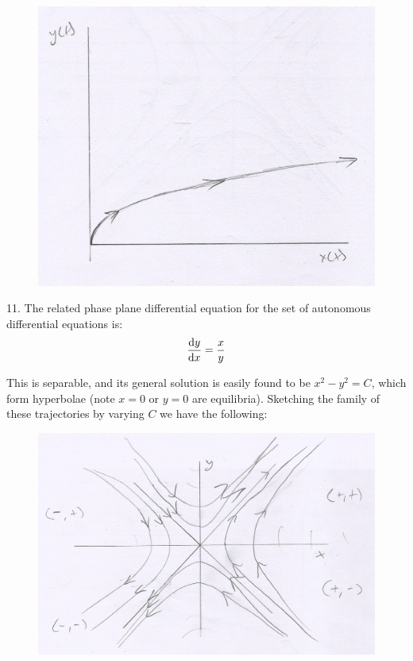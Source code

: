 \documentclass[11pt]{article}
\begin{document}
\begin{figure}[h]
    \centering
    \includegraphics[scale=0.75]{sketch1}
\end{figure}

11. The related phase plane differential equation for the set of autonomous differential equations is:
$$\dv{y}{x} = \frac{x}{y}$$

This is separable, and its general solution is easily found to be $x^2 - y^2 = C$, which form hyperbolae (note $x=0$ or $y=0$ are equilibria). Sketching the family of these trajectories by varying $C$ we have the following:

\begin{figure}[h]
    \centering
    \includegraphics[scale=0.75]{sketch2}
\end{figure}
\end{document}
